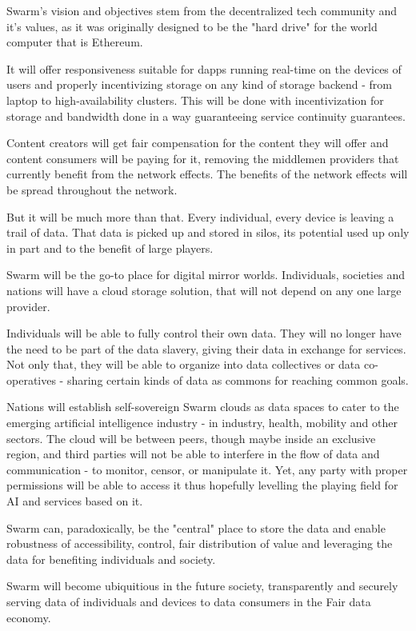 Swarm's vision and objectives stem from the decentralized tech community and it's values, as it was originally designed to be the "hard drive" for the world computer that is Ethereum.

It will offer responsiveness suitable for dapps running real-time on the devices of users and properly incentivizing storage on any kind of storage backend - from laptop to high-availability clusters. This will be done with incentivization for storage and bandwidth done in a way guaranteeing service continuity guarantees.

Content creators will get fair compensation for the content they will offer and content consumers will be paying for it, removing the middlemen providers that currently benefit from the network effects. The benefits of the network effects will be spread throughout the network.

But it will be much more than that. Every individual, every device is leaving a trail of data. That data is picked up and stored in silos, its potential used up only in part and to the benefit of large players.

Swarm will be the go-to place for digital mirror worlds. Individuals, societies and nations will have a cloud storage solution, that will not depend on any one large provider. 


Individuals will be able to fully control their own data. They will no longer have the need to be part of the data slavery, giving their data in exchange for services. Not only that, they will be able to organize into data collectives or data co-operatives - sharing certain kinds of data as commons for reaching common goals. 

Nations will establish self-sovereign Swarm clouds as data spaces to cater to the emerging artificial intelligence industry - in industry, health, mobility and other sectors. The cloud will be between peers, though maybe inside an exclusive region, and third parties will not be able to interfere in the flow of data and communication - to monitor, censor,  or manipulate it. Yet, any party with proper permissions will be able to access it thus hopefully levelling the playing field for AI and services based on it.  

Swarm can, paradoxically, be the "central" place to store the data and enable robustness of accessibility, control, fair distribution of value and leveraging the data for benefiting individuals and society.

Swarm will become ubiquitious in the future society, transparently and securely serving data of individuals and devices to data consumers in the Fair data economy.

